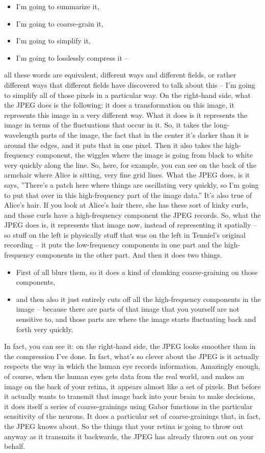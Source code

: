 \documentclass[]{article}
\begin{document}
\begin{itemize}
	\item I'm going to summarize it,
	\item I'm going to coarse-grain it,
	\item I'm going to simplify it,
	\item I'm going to losslessly compress it –
\end{itemize}
all these words are equivalent,
different ways and different fields,
or rather different ways
that different fields
have discovered to talk about this –
I'm going to simplify all of those pixels
in a particular way.
On the right-hand side,
what the JPEG does is the following:
it does a transformation on this image,
it represents this image
in a very different way.
What it does is it represents the image
in terms of the fluctuations
that occur in it.
So, it takes the long-wavelength
parts of the image,
the fact that in the center
it's darker than it is around the edges,
and it puts that in one pixel.
Then it also takes
the high-frequency component,
the wiggles where the image is going
from black to white
very quickly along the line.
So, here, for example, you can see
on the back of the armchair
where Alice is sitting,
very fine grid lines.
What the JPEG does, is it says,
''There's a patch here where things
are oscillating very quickly,
so I'm going to put that over
in this high-frequency part
of the image data.''
It's also true of Alice's hair.
If you look at Alice's hair there,
she has these sort of kinky curls,
and those curls
have a high-frequency component
the JPEG records.
So, what the JPEG does is,
it represents that image now,
instead of representing it spatially –
so stuff on the left
is physically stuff that was on the left
in Tenniel's original recording –
it puts the low-frequency components
in one part
and the high-frequency components
in the other part.
And then it does two things.

\begin{itemize}
	\item First of all blurs them,
	so it does a kind of chunking
	coarse-graining on those components,
	\item and then also it just entirely cuts off
	all the high-frequency components
	in the image –
	because there are parts of that image
	that you yourself are not sensitive to,
	and those parts are where the image starts
	fluctuating back and forth very quickly.
\end{itemize}

In fact, you can see it:
on the right-hand side,
the JPEG looks smoother
than in the compression I've done.
In fact, what's so clever about the JPEG
is it actually respects the way
in which the human eye
records information.
Amazingly enough, of course,
when the human eyes
gets data from the real world,
and makes an image
on the back of your retina,
it appears almost like a set of pixels.
But before it actually wants to transmit
that image back into your brain
to make decisions,
it does itself
a series of coarse-grainings
using Gabor functions in the particular
sensitivity of the neurons.
It does a particular set
of coarse-grainings
that, in fact, the JPEG knows about.
So the things that your retina
is going to throw out anyway
as it transmits it backwards,
the JPEG has already thrown out
on your behalf.
\end{document}
